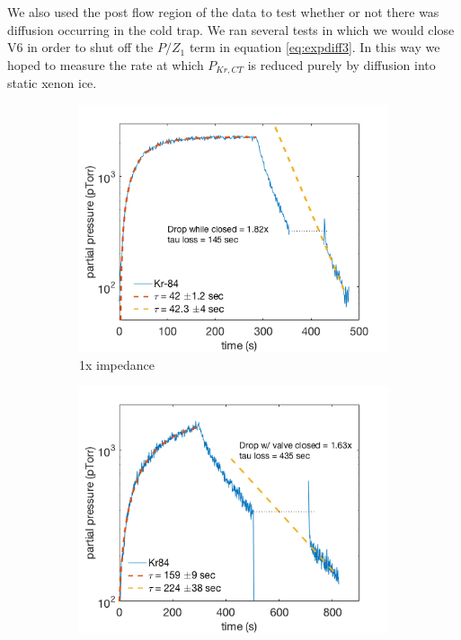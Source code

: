 We also used the post flow region of the data to test whether or not there was diffusion occurring in the cold trap. We ran several tests in which we would close V6 in order to shut off the $P/Z_1$ term in equation \ref{eq:expdiff3}. In this way we hoped to measure the rate at which $P_{Kr,CT}$ is reduced purely by diffusion into static xenon ice. 
\begin{figure}[h!]
\centering
\begin{subfigure}{0.5\textwidth}
  \centering
  \includegraphics[width=\textwidth]{Figures/cyrano_pvt_1x.png}
  \caption{1x impedance}
  \label{fig:cyrano1x}
\end{subfigure}%
\begin{subfigure}{0.5\textwidth}
  \centering
  \includegraphics[width=\textwidth]{Figures/cyrano_pvt_15x.png}

\end{subfigure}
\end{figure}
